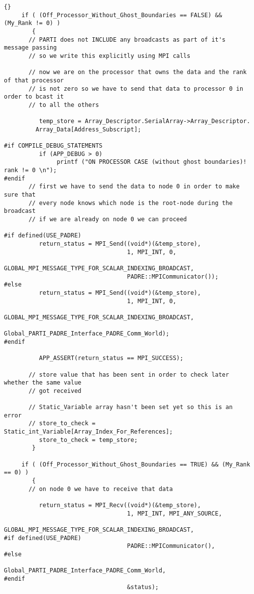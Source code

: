 \documentclass[10pt]{llncs}
\begin{document}
\begin{lstlisting}{}
     if ( (Off_Processor_Without_Ghost_Boundaries == FALSE) && (My_Rank != 0) )
        {
       // PARTI does not INCLUDE any broadcasts as part of it's message passing
       // so we write this explicitly using MPI calls

       // now we are on the processor that owns the data and the rank of that processor
       // is not zero so we have to send that data to processor 0 in order to bcast it
       // to all the others

          temp_store = Array_Descriptor.SerialArray->Array_Descriptor.
	     Array_Data[Address_Subscript];

#if COMPILE_DEBUG_STATEMENTS
          if (APP_DEBUG > 0)
               printf ("ON PROCESSOR CASE (without ghost boundaries)! rank != 0 \n");
#endif
       // first we have to send the data to node 0 in order to make sure that
       // every node knows which node is the root-node during the broadcast
       // if we are already on node 0 we can proceed

#if defined(USE_PADRE)
          return_status = MPI_Send((void*)(&temp_store),
                                   1, MPI_INT, 0, 
                                   GLOBAL_MPI_MESSAGE_TYPE_FOR_SCALAR_INDEXING_BROADCAST,
                                   PADRE::MPICommunicator());
#else
          return_status = MPI_Send((void*)(&temp_store),
                                   1, MPI_INT, 0, 
                                   GLOBAL_MPI_MESSAGE_TYPE_FOR_SCALAR_INDEXING_BROADCAST,
                                   Global_PARTI_PADRE_Interface_PADRE_Comm_World);
#endif

          APP_ASSERT(return_status == MPI_SUCCESS);

       // store value that has been sent in order to check later whether the same value
       // got received

       // Static_Variable array hasn't been set yet so this is an error
       // store_to_check = Static_int_Variable[Array_Index_For_References];
          store_to_check = temp_store; 
        }

     if ( (Off_Processor_Without_Ghost_Boundaries == TRUE) && (My_Rank == 0) )
        {
       // on node 0 we have to receive that data 

          return_status = MPI_Recv((void*)(&temp_store),
                                   1, MPI_INT, MPI_ANY_SOURCE, 
                                   GLOBAL_MPI_MESSAGE_TYPE_FOR_SCALAR_INDEXING_BROADCAST,
#if defined(USE_PADRE)
                                   PADRE::MPICommunicator(),
#else
                                   Global_PARTI_PADRE_Interface_PADRE_Comm_World,
#endif
                                   &status);


\end{lstlisting}
\end{document}
